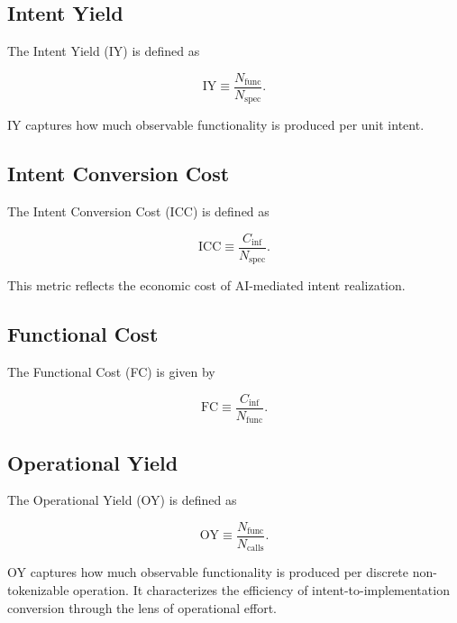 \documentclass[twocolumn]{aastex701}
\begin{document}
\subsection{Intent Yield}

The Intent Yield (IY) is defined as

\begin{equation}
\mathrm{IY} \equiv \frac{N_{\mathrm{func}}}{N_{\mathrm{spec}}}.
\end{equation}

IY captures how much observable functionality is produced per unit intent.

\subsection{Intent Conversion Cost}

The Intent Conversion Cost (ICC) is defined as

\begin{equation}
\mathrm{ICC} \equiv \frac{C_{\mathrm{inf}}}{N_{\mathrm{spec}}}.
\end{equation}

This metric reflects the economic cost of AI-mediated intent realization.

\subsection{Functional Cost}

The Functional Cost (FC) is given by

\begin{equation}
\mathrm{FC} \equiv \frac{C_{\mathrm{inf}}}{N_{\mathrm{func}}}.
\end{equation}

\subsection{Operational Yield}

The Operational Yield (OY) is defined as

\begin{equation}
\mathrm{OY} \equiv \frac{N_{\mathrm{func}}}{N_{\mathrm{calls}}}.
\end{equation}

OY captures how much observable functionality is produced per discrete
non-tokenizable operation.
It characterizes the efficiency of intent-to-implementation conversion
through the lens of operational effort.
\end{document}
